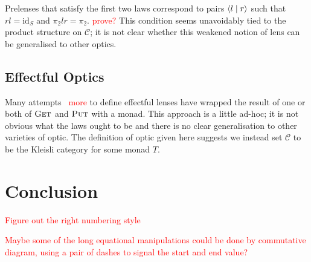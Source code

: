 \documentclass[11pt,a4paper]{article}
\theoremstyle{plain}
\theoremstyle{definition}
\newcommand{\C}{\mathscr{C}}
\newcommand{\id}{\mathrm{id}}
\newcommand{\rep}[2]{{\ensuremath \left\langle #1 \mid #2 \right\rangle}}
\newcommand{\fget}{\textsc{Get}}
\newcommand{\fput}{\textsc{Put}}
\newcommand{\todo}[1]{\textcolor{red}{\small #1}}
\begin{document}
Prelenses that satisfy the first two laws correspond to pairs $\rep{l}{r }$ such that $rl = \id_S$ and $\pi_2lr = \pi_2$. \todo{prove?} This condition seems unavoidably tied to the product structure on $\C$; it is not clear whether this weakened notion of lens can be generalised to other optics.

\subsection{Effectful Optics}

Many attempts~\cite{ReflectionsOnMonadicLenses} \todo{more} to define effectful lenses have wrapped the result of one or both of $\fget$ and $\fput$ with a monad. This approach is a little ad-hoc; it is not obvious what the laws ought to be and there is no clear generalisation to other varieties of optic. The definition of optic given here suggests we instead set $\C$ to be the Kleisli category for some monad $T$.

\section{Conclusion}

\todo{Figure out the right numbering style}

\todo{Maybe some of the long equational manipulations could be done by commutative diagram, using a pair of dashes to signal the start and end value?}



\end{document}
